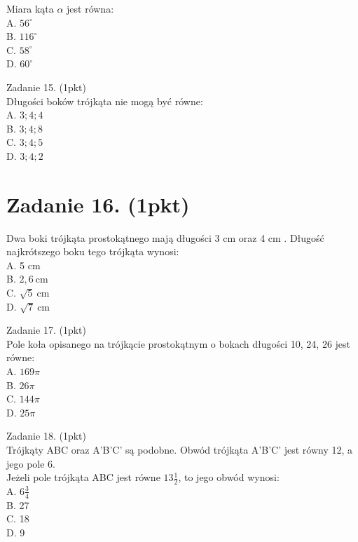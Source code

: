 \documentclass[10pt]{article}
\begin{document}
Miara kąta \(\alpha\) jest równa:\\
A. \(56^{\circ}\)\\
B. \(116^{\circ}\)\\
C. \(58^{\circ}\)\\
D. \(60^{\circ}\)

Zadanie 15. (1pkt)\\
Długości boków trójkąta nie mogą być równe:\\
A. \(3 ; 4 ; 4\)\\
B. \(3 ; 4 ; 8\)\\
C. \(3 ; 4 ; 5\)\\
D. \(3 ; 4 ; 2\)

\section*{Zadanie 16. (1pkt)}
Dwa boki trójkąta prostokątnego mają długości 3 cm oraz 4 cm . Długość najkrótszego boku tego trójkąta wynosi:\\
A. 5 cm\\
B. \(2,6 \mathrm{~cm}\)\\
C. \(\sqrt{5} \mathrm{~cm}\)\\
D. \(\sqrt{7} \mathrm{~cm}\)

Zadanie 17. (1pkt)\\
Pole koła opisanego na trójkącie prostokątnym o bokach długości 10, 24, 26 jest równe:\\
A. \(169 \pi\)\\
B. \(26 \pi\)\\
C. \(144 \pi\)\\
D. \(25 \pi\)

Zadanie 18. (1pkt)\\
Trójkąty ABC oraz A'B'C' są podobne. Obwód trójkąta A'B'C' jest równy 12, a jego pole 6.\\
Jeżeli pole trójkąta ABC jest równe \(13 \frac{1}{2}\), to jego obwód wynosi:\\
A. \(6 \frac{3}{4}\)\\
B. 27\\
C. 18\\
D. 9
\end{document}
